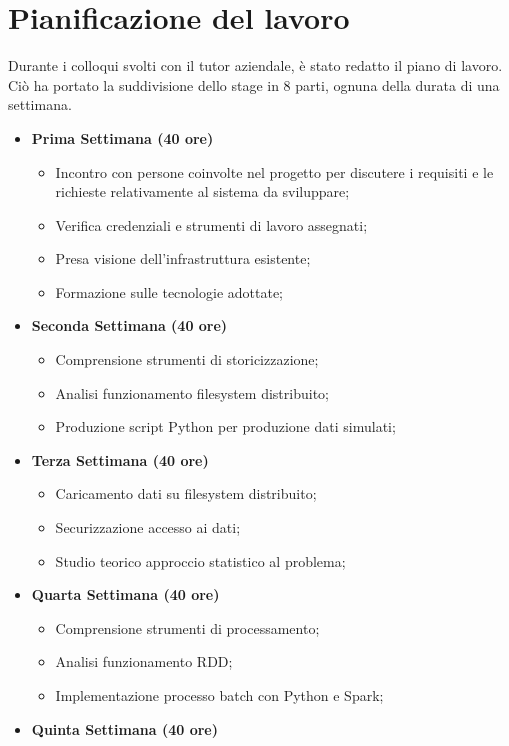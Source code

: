 \section{Pianificazione del lavoro}
Durante i colloqui svolti con il tutor aziendale, è stato redatto il piano di lavoro. Ciò ha portato la suddivisione dello stage in 8 parti, ognuna della durata di una settimana.
    \begin{itemize}
	\item[] \textbf{Prima Settimana (40 ore)}
	\begin{itemize}
		\item Incontro con persone coinvolte nel progetto per discutere i requisiti e le richieste
		relativamente al sistema da sviluppare;
		\item Verifica credenziali e strumenti di lavoro assegnati;
		\item Presa visione dell’infrastruttura esistente;
		\item Formazione sulle tecnologie adottate;
	\end{itemize}
	\item[] \textbf{Seconda Settimana (40 ore)} 
	\begin{itemize}
		\item Comprensione strumenti di storicizzazione;
		\item Analisi funzionamento filesystem distribuito;
		\item Produzione script Python per produzione dati simulati;
	\end{itemize}
	\item[] \textbf{Terza Settimana (40 ore)} 
	\begin{itemize}
		\item Caricamento dati su filesystem distribuito;
		\item Securizzazione accesso ai dati;
		\item Studio teorico approccio statistico al problema;
	\end{itemize}
	\item[] \textbf{Quarta Settimana (40 ore)} 
	\begin{itemize}
		\item Comprensione strumenti di processamento;
		\item Analisi funzionamento RDD;
		\item Implementazione processo batch con Python e Spark;        
	\end{itemize}
	\item[] \textbf{Quinta Settimana (40 ore)} 
	\begin{itemize}

\end{itemize}
\end{itemize}
